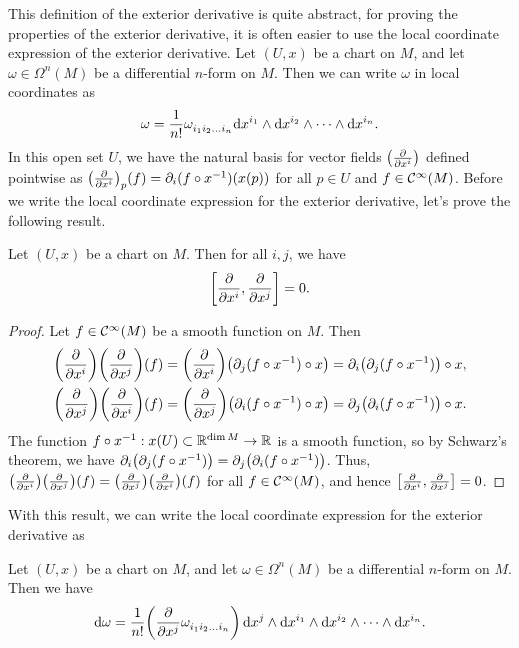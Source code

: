 This definition of the exterior derivative is quite abstract, for proving the properties of the exterior derivative, it is often easier to use the local coordinate expression of the exterior derivative. Let \((U, x)\) be a chart on \(M\), and let \(\omega \in \Omega^n(M)\) be a differential \(n\)-form on \(M\). Then we can write \(\omega\) in local coordinates as
\begin{equation*}
    \omega = \frac{1}{n!} \tensor{\omega}{_{i_1}_{i_2}_{\ldots}_{i_n}} \dd x^{i_1} \wedge \dd x^{i_2} \wedge \cdots \wedge \dd x^{i_n}.
\end{equation*}
In this open set \(U\), we have the natural basis for vector fields \(\qty(\pdv{x^i})\) defined pointwise as \(\qty(\pdv{x^i})_p(f) = \partial_i(f \circ x^{-1})(x(p))\) for all \(p \in U\) and \(f \in \mathcal C^\infty(M)\). Before we write the local coordinate expression for the exterior derivative, let's prove the following result.
\begin{proposition} \label{prop:basis_commute}
    Let \((U, x)\) be a chart on \(M\). Then for all \(i, j\), we have
    \begin{equation*}
        \comm{\pdv{x^i}}{\pdv{x^j}} = 0.
    \end{equation*}
\end{proposition}
\begin{proof}
    Let \(f \in \mathcal C^\infty(M)\) be a smooth function on \(M\). Then
    \begin{align*}
        \qty(\pdv{x^i})\qty(\pdv{x^j})(f) & = \qty(\pdv{x^i})\qty(\partial_j(f \circ x^{-1}) \circ x) = \partial_i\qty(\partial_j(f \circ x^{-1})) \circ x, \\
        \qty(\pdv{x^j})\qty(\pdv{x^i})(f) & = \qty(\pdv{x^j})\qty(\partial_i(f \circ x^{-1}) \circ x) = \partial_j\qty(\partial_i(f \circ x^{-1})) \circ x.
    \end{align*}
    The function \(f \circ x^{-1}: x(U) \subset \mathbb R^{\dim M} \to \mathbb R\) is a smooth function, so by Schwarz's theorem, we have \(\partial_i\qty(\partial_j(f \circ x^{-1})) = \partial_j\qty(\partial_i(f \circ x^{-1}))\). Thus, \(\qty(\pdv{x^i})\qty(\pdv{x^j})(f) = \qty(\pdv{x^j})\qty(\pdv{x^i})(f)\) for all \(f \in \mathcal C^\infty(M)\), and hence \(\comm{\pdv{x^i}}{\pdv{x^j}} = 0\).
\end{proof}
With this result, we can write the local coordinate expression for the exterior derivative as
\begin{theorem}
    Let \((U, x)\) be a chart on \(M\), and let \(\omega \in \Omega^n(M)\) be a differential \(n\)-form on \(M\). Then we have
    \begin{equation*}
        \dd \omega = \frac{1}{n!} \qty(\pdv{x^j} \tensor{\omega}{_{i_1}_{i_2}_{\ldots}_{i_n}}) \dd{x^j} \wedge \dd x^{i_1} \wedge \dd x^{i_2} \wedge \cdots \wedge \dd x^{i_n}.
    \end{equation*}
\end{theorem}
